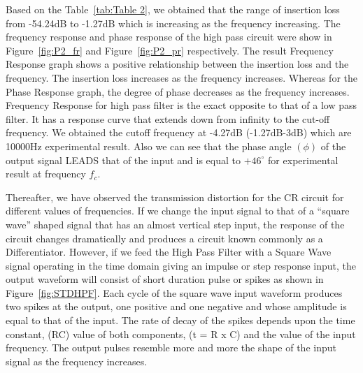 \documentclass[a4paper, 12pt, english]{article}
\begin{document}
Based on the Table~\ref{tab:Table 2}, we obtained that the range of insertion loss from -54.24dB to -1.27dB which is increasing as the frequency increasing. The frequency response and phase response of the high pass circuit were show in Figure~\ref{fig:P2_fr} and Figure~\ref{fig:P2_pr} respectively. The result Frequency Response graph shows a positive relationship between the insertion loss and the frequency. The insertion loss increases as the frequency increases. Whereas for the Phase Response graph, the degree of phase decreases as the frequency increases.
Frequency Response for high pass filter is the exact opposite to that of a low pass filter. It has a response curve that extends down from infinity to the cut-off frequency. We obtained the cutoff frequency at -4.27dB (-1.27dB-3dB) which are 10000Hz experimental result. Also we can see that the phase angle $(\phi)$ of the output signal LEADS that of the input and is equal to $+46^{\circ}$ for experimental result at frequency $f_{c}$.
\newline

Thereafter, we have observed the transmission distortion for the CR circuit for different values of frequencies. If we change the input signal to that of a “square wave” shaped signal that has an almost vertical step input, the response of the circuit changes dramatically and produces a circuit known commonly as a Differentiator. However, if we feed the High Pass Filter with a Square Wave signal operating in the time domain giving an impulse or step response input, the output waveform will consist of short duration pulse or spikes as shown in Figure~\ref{fig:STDHPF}. Each cycle of the square wave input waveform produces two spikes at the output, one positive and one negative and whose amplitude is equal to that of the input. The rate of decay of the spikes depends upon the time constant, (RC) value of both components, (t = R x C) and the value of the input frequency. The output pulses resemble more and more the shape of the input signal as the frequency increases.
\end{document}
